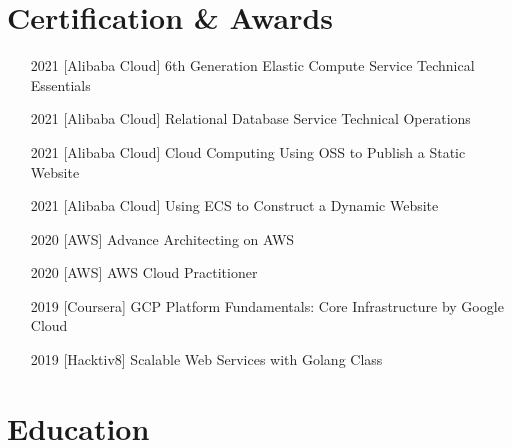 \documentclass[11pt]{article}
\begin{document}

\section{Certification \& Awards}
\begin{enumerate}[itemsep=0pt]
    \item [2021] [Alibaba Cloud] 6th Generation Elastic Compute Service Technical Essentials
    \item [2021] [Alibaba Cloud] Relational Database Service Technical Operations
    \item [2021] [Alibaba Cloud] Cloud Computing Using OSS to Publish a Static Website
    \item [2021] [Alibaba Cloud] Using ECS to Construct a Dynamic Website
    \item [2020] [AWS] Advance Architecting on AWS
    \item [2020] [AWS] AWS Cloud Practitioner
    \item [2019] [Coursera] GCP Platform Fundamentals: Core Infrastructure by Google Cloud
    \item [2019] [Hacktiv8] Scalable Web Services with Golang Class
\end{enumerate}

\section{Education}
\vspace{0.5\baselineskip}
\end{document}
